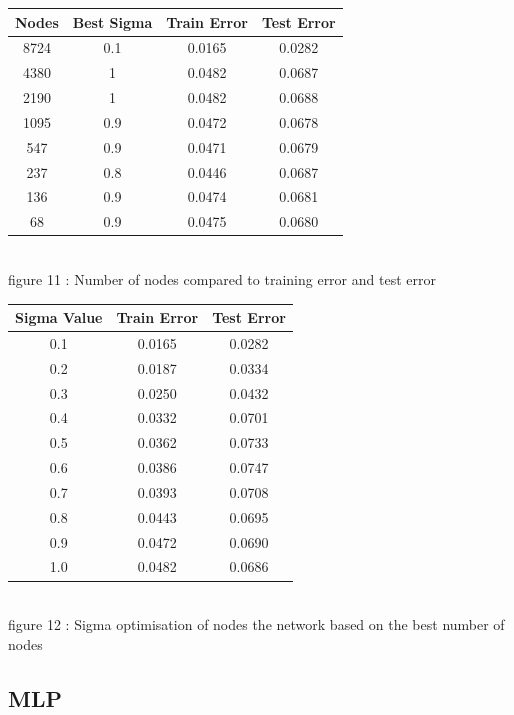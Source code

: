 \documentclass{IEEEtran}[11pt]
\begin{document}
  \begin{center}



    \begin{tabular}{||c c c c||}
      \hline
      Nodes & Best Sigma & Train Error & Test Error \\ [0.5ex]
      \hline
      8724 & 0.1 & 0.0165 & 0.0282 \\
      4380 & 1 & 0.0482 & 0.0687 \\
      2190 & 1 & 0.0482 & 0.0688 \\
      1095 & 0.9 & 0.0472 & 0.0678\\
      547  & 0.9 & 0.0471 & 0.0679\\
      237  & 0.8 & 0.0446 & 0.0687\\
      136  & 0.9 & 0.0474 & 0.0681\\
      68   & 0.9 & 0.0475 & 0.0680\\
      \hline
    \end{tabular}
    \\
    \vspace{2.5mm}
    {\footnotesize figure 11 : Number of nodes compared to training error and
    test error}
  \end{center}
\begin{center}
  \begin{tabular}{||c c c||}
    \hline
    Sigma Value & Train Error & Test Error \\ [0.5ex]
    \hline
    0.1 & 0.0165 & 0.0282 \\
    0.2 & 0.0187 & 0.0334 \\
    0.3 & 0.0250 & 0.0432 \\
    0.4 & 0.0332 & 0.0701 \\
    0.5 & 0.0362 & 0.0733 \\
    0.6 & 0.0386 & 0.0747 \\
    0.7 & 0.0393 & 0.0708 \\
    0.8 & 0.0443 & 0.0695 \\
    0.9 & 0.0472 & 0.0690 \\
    1.0 & 0.0482 & 0.0686 \\
    \hline
  \end{tabular}
  \\
  \vspace{2.5mm}
  {\footnotesize figure 12 : Sigma optimisation of nodes the network based on the
  best number of nodes}
\end{center}
\subsection{MLP}
\end{document}
